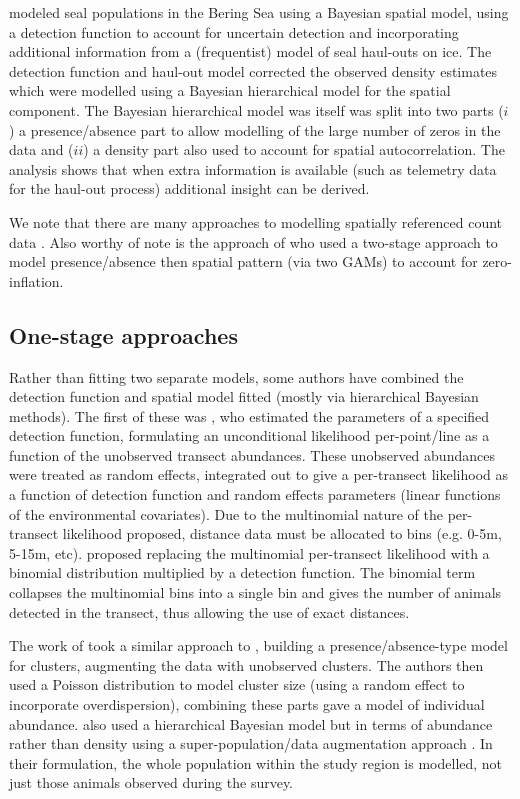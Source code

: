 \documentclass[a4paper,12pt]{article}
\begin{document}
\cite{VerHoef:2013ky} modeled seal populations in the Bering Sea using a Bayesian spatial model, using a detection function to account for uncertain detection and incorporating additional information from a (frequentist) model of seal haul-outs on ice. The detection function and haul-out model corrected the observed density estimates which were modelled using a Bayesian hierarchical model for the spatial component. The Bayesian hierarchical model was itself was split into two parts ($i$) a presence/absence part to allow modelling of the large number of zeros in the data and ($ii$) a density part also used to account for spatial autocorrelation. The analysis shows that when extra information is available (such as telemetry data for the haul-out process) additional insight can be derived.

We note that there are many approaches to modelling spatially referenced count data \citep[][provides an overview of such methods for marine bird modelling]{Oppel:2011tv}. Also worthy of note is the approach of \cite{Barry:2002bm} who used a two-stage approach to model presence/absence then spatial pattern (via two GAMs) to account for zero-inflation.

\subsection*{One-stage approaches}

Rather than fitting two separate models, some authors have combined the detection function and spatial model fitted (mostly via hierarchical Bayesian methods). The first of these was \cite{Royle:2004tu}, who estimated the parameters of a specified detection function, formulating an unconditional likelihood per-point/line as a function of the unobserved transect abundances. These unobserved abundances were treated as random effects, integrated out to give a per-transect likelihood as a function of detection function and random effects parameters (linear functions of the environmental covariates). Due to the multinomial nature of the per-transect likelihood proposed, distance data must be allocated to bins (e.g. 0-5m, 5-15m, etc). \cite{Chelgren:2011us} proposed replacing the multinomial per-transect likelihood with a binomial distribution multiplied by a detection function. The binomial term collapses the multinomial bins into a single bin and gives the number of animals detected in the transect, thus allowing the use of exact distances.

The work of \cite{Schmidt:2011ec} took a similar approach to \cite{Royle:2008wc}, building a presence/absence-type model for clusters, augmenting the data with unobserved clusters. The authors then used a Poisson distribution to model cluster size (using a random effect to incorporate overdispersion), combining these parts gave a model of individual abundance. \cite{Conn:2012bx} also used a hierarchical Bayesian model but in terms of abundance rather than density using a super-population/data augmentation approach \cite[as in][]{Link:2009wv}. In their formulation, the whole population within the study region is modelled, not just those animals observed during the survey.
\end{document}
